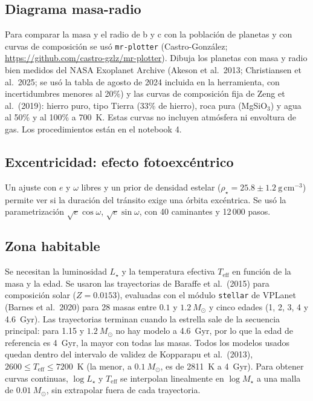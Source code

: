 \documentclass[twocolumn,aps,pra,11pt]{revtex4-2}
\newcommand{\Msun}{\ensuremath{M_\odot}}
\newcommand{\nb}[1]{\url{#1}}
\begin{document}
\subsection{Diagrama masa-radio}\label{sec:mr}

Para comparar la masa y el radio de b y c con la población de planetas y con curvas de composición se usó \texttt{mr-plotter} (Castro-González; \nb{https://github.com/castro-gzlz/mr-plotter}). Dibuja los planetas con masa y radio bien medidos del NASA Exoplanet Archive (Akeson et al.\ 2013; Christiansen et al.\ 2025; se usó la tabla de agosto de 2024 incluida en la herramienta, con incertidumbres menores al 20\%) y las curvas de composición fija de Zeng et al.\ (2019): hierro puro, tipo Tierra (33\% de hierro), roca pura (MgSiO$_3$) y agua al 50\% y al 100\% a 700~K. Estas curvas no incluyen atmósfera ni envoltura de gas. Los procedimientos están en el notebook 4.

\subsection{Excentricidad: efecto fotoexcéntrico}

Un ajuste con $e$ y $\omega$ libres y un prior de densidad estelar ($\rho_\star = 25.8 \pm 1.2~\mathrm{g\,cm^{-3}}$) permite ver si la duración del tránsito exige una órbita excéntrica. Se usó la parametrización $\sqrt{e}\cos\omega$, $\sqrt{e}\sin\omega$, con 40 caminantes y 12\,000 pasos.

\subsection{Zona habitable}

Se necesitan la luminosidad $L_\star$ y la temperatura efectiva $T_\mathrm{eff}$ en función de la masa y la edad. Se usaron las trayectorias de Baraffe et al.\ (2015) para composición solar ($Z = 0.0153$), evaluadas con el módulo \texttt{stellar} de VPLanet (Barnes et al.\ 2020) para 28 masas entre $0.1$ y $1.2~\Msun$ y cinco edades (1, 2, 3, 4 y 4.6~Gyr). Las trayectorias terminan cuando la estrella sale de la secuencia principal: para 1.15 y $1.2~\Msun$ no hay modelo a 4.6~Gyr, por lo que la edad de referencia es 4~Gyr, la mayor con todas las masas. Todos los modelos usados quedan dentro del intervalo de validez de Kopparapu et al.\ (2013), $2600 \le T_\mathrm{eff} \le 7200$~K (la menor, a $0.1~\Msun$, es de 2811~K a 4~Gyr). Para obtener curvas continuas, $\log L_\star$ y $T_\mathrm{eff}$ se interpolan linealmente en $\log M_\star$ a una malla de $0.01~\Msun$, sin extrapolar fuera de cada trayectoria.
\end{document}
